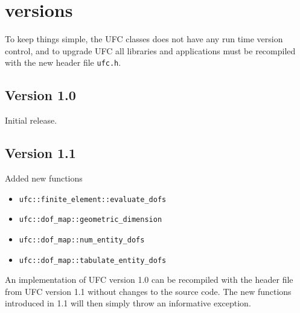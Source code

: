 \chapter{\ufc{} versions}
\label{app:versions}

To keep things simple, the UFC classes does not have any run time version control, and to upgrade
UFC all libraries and applications must be recompiled with the new header file \texttt{ufc.h}.

\section{Version 1.0}
Initial release.

\section{Version 1.1}
Added new functions
\begin{itemize}
\item \texttt{ufc::finite\_element::evaluate\_dofs}
\item \texttt{ufc::dof\_map::geometric\_dimension}
\item \texttt{ufc::dof\_map::num\_entity\_dofs}
\item \texttt{ufc::dof\_map::tabulate\_entity\_dofs}
\end{itemize}

An implementation of UFC version 1.0 can be recompiled with the header file from UFC version 1.1
without changes to the source code. The new functions introduced in 1.1 will then simply throw
an informative exception.

